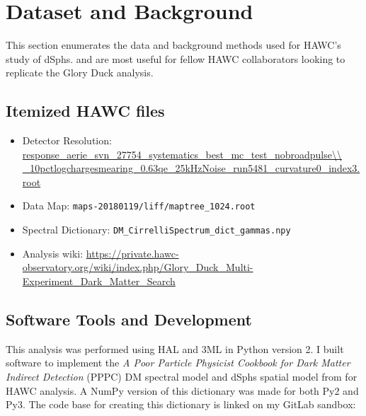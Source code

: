 \section{Dataset and Background}\label{sec:gd_databgd}

This section enumerates the data and background methods used for HAWC's study of dSphs.
 and  are most useful for fellow HAWC collaborators looking to replicate the Glory Duck analysis.

\subsection{Itemized HAWC files}\label{sec:gd_data}
\begin{itemize}
    \item Detector Resolution: \url{response\_aerie\_svn\_27754\_systematics\_best\_mc\_test\_nobroadpulse\\
    \_10pctlogchargesmearing\_0.63qe\_25kHzNoise\_run5481\_curvature0\_index3.root}
    \item Data Map: \texttt{maps-20180119/liff/maptree\_1024.root}
    \item Spectral Dictionary: \texttt{DM\_CirrelliSpectrum\_dict\_gammas.npy}
    \item Analysis wiki: \url{https://private.hawc-observatory.org/wiki/index.php/Glory_Duck_Multi-Experiment_Dark_Matter_Search}
\end{itemize}

\subsection{Software Tools and Development}\label{sec:gd_tools}

This analysis was performed using HAL and 3ML \cite{Abeysekara_2017, vianello2015multimission} in Python version 2.
I built software to implement the \emph{A Poor Particle Physicist Cookbook for Dark Matter Indirect Detection} (PPPC) \cite{Cirelli_2011} DM spectral model and dSphs spatial model from \cite{Geringer_Sameth_2015} for HAWC analysis.
A NumPy version of this dictionary was made for both Py2 and Py3.
The code base for creating this dictionary is linked on my GitLab sandbox:

